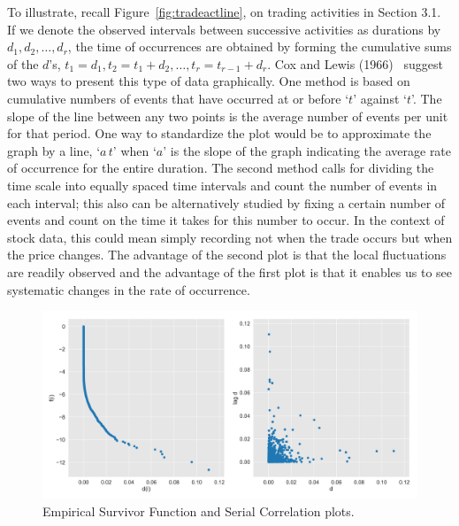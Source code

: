 To illustrate, recall Figure~\ref{fig:tradeactline}, on trading activities in Section 3.1. If we denote the observed intervals between successive activities as durations by $d_1, d_2, \ldots,d_r$, the time of occurrences are obtained by forming the cumulative sums of the $d$'s, $t_1= d_1, t_2= t_1 + d_2, \ldots, t_r=t_{r-1} + d_r$. Cox and Lewis (1966)~\cite{cox1966} suggest two ways to present this type of data graphically. One method is based on cumulative numbers of events that have occurred at or before `$t$' against `$t$'. The slope of the line between any two points is the average number of events per unit for that period. One way to standardize the plot would be to approximate the graph by a line, `$a\,t$' when `$a$' is the slope of the graph indicating the average rate of occurrence for the entire duration. The second method calls for dividing the time scale into equally spaced time intervals and count the number of events in each interval; this also can be alternatively studied by fixing a certain number of events and count on the time it takes for this number to occur. In the context of stock data, this could mean simply recording not when the trade occurs but when the price changes. The advantage of the second plot is that the local fluctuations are readily observed and the advantage of the first plot is that it enables us to see systematic changes in the rate of occurrence.
 
 	\begin{figure}[!ht]
	\centering	
	\includegraphics[width=\textwidth]{chapters/chapter_advanced/figures/survivor.png}
	\caption{Empirical Survivor Function and Serial Correlation plots.\label{fig:survivor}}
	\end{figure}
	
